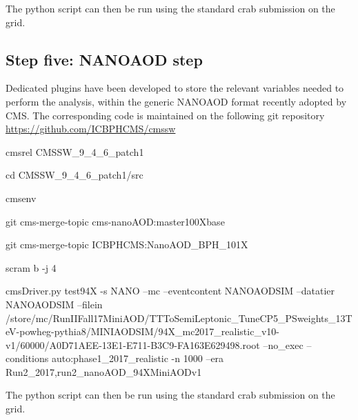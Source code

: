 \documentclass[a4paper,11pt]{article}
\begin{document}
The python script can then be run using the standard crab submission on the grid.


\subsection{Step five: NANOAOD step}

Dedicated plugins have been developed to store the relevant variables needed to perform the analysis, within the generic NANOAOD format recently adopted by CMS.
The corresponding code is maintained on the following git repository
\url{https://github.com/ICBPHCMS/cmssw}

\bigbreak
cmsrel CMSSW\_9\_4\_6\_patch1

cd CMSSW\_9\_4\_6\_patch1/src

cmsenv

git cms-merge-topic cms-nanoAOD:master100Xbase

git cms-merge-topic ICBPHCMS:NanoAOD\_BPH\_101X

scram b -j 4

cmsDriver.py test94X -s NANO --mc --eventcontent NANOAODSIM --datatier NANOAODSIM --filein /store/mc/RunIIFall17MiniAOD/TTToSemiLeptonic\_TuneCP5\_PSweights\_13TeV-powheg-pythia8/MINIAODSIM/94X\_mc2017\_realistic\_v10-v1/60000/A0D71AEE-13E1-E711-B3C9-FA163E629498.root --no\_exec  --conditions auto:phase1\_2017\_realistic -n 1000 --era Run2\_2017,run2\_nanoAOD\_94XMiniAODv1
\bigbreak

The python script can then be run using the standard crab submission on the grid.






\end{document}
